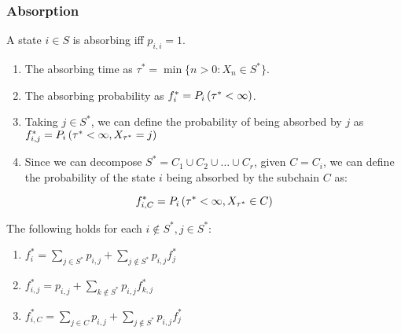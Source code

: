  \begin{frame} \frametitle{Absorption}
    \vspace{2em}
    
    \begin{definition}
    A state \(i\in S\) is absorbing iff \(p_{i,i} = 1\).
    \end{definition}
  
  \begin{definition}
    \begin{enumerate}
    \item The absorbing time as \(\tau^{\ast} = \min \{n > 0: X_n \in S^{\ast}\}\).
    \item The absorbing probability as \(f_{i}^{\ast} = P_i\left({\tau^{\ast} < \infty}\right)\).
    \item Taking \(j\in S^{\ast}\), we can define the probability of being absorbed by \(j\) as \(f_{i,j}^{\ast} = P_i\left({\tau^{\ast} < \infty, X_{\tau^{\ast}} = j}\right)\)
    \item Since we can decompose \(S^{\ast} = C_1 \cup C_2 \cup \ldots \cup C_r\), given \(C = C_i\), we can define the probability of the state \(i\) being absorbed by the subchain \(C\) as:
    \end{enumerate}

    \[
    f_{i,C}^{\ast} = P_i\left({\tau^{\ast} < \infty, X_{\tau^{\ast}} \in C}\right)
    \]
    \end{definition}

    \begin{proposition}
    The following holds for each \(i \not\in S^{\ast}, j\in S^{\ast}\):

    \begin{enumerate}
    \item \(f_i^{\ast} = \sum_{j \in S^{\ast}} p_{i,j} + \sum_{j \not\in S^{\ast}} p_{i,j} f_{j}^{\ast}\)
    \item \(f_{i,j}^{\ast} = p_{i,j} + \sum_{k \not\in S^{\ast}} p_{i,j} f_{k,j}^{\ast}\)
    \item \(f_{i,C}^{\ast} = \sum_{j \in C} p_{i,j} + \sum_{j \not\in S^{\ast}} p_{i,j} f_{j}^{\ast}\)
    \end{enumerate}
    \end{proposition}
 \end{frame}
 
